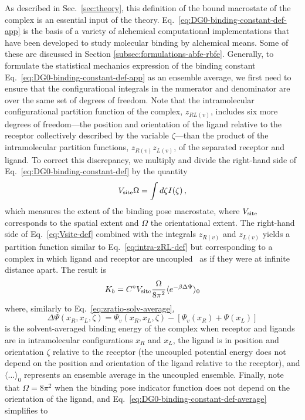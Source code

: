 \documentclass[9pt,bestpractices]{livecoms}
\begin{document}
As described in Sec.~\ref{sec:theory}, this definition of the bound macrostate of the complex is an essential input of the theory.  Eq.~\ref{eq:DG0-binding-constant-def-app} is the basis of a variety of alchemical computational implementations that have been developed to study molecular binding by alchemical means. Some of these are discussed in Section \ref{subsec:formulations-abfe-rbfe}. Generally, to formulate the statistical mechanics expression of the binding constant Eq.~\ref{eq:DG0-binding-constant-def-app} as an ensemble average, we first need to ensure that the configurational integrals in the numerator and denominator are over the same set of degrees of freedom. Note that the intramolecular configurational partition function of the complex, $z_{RL(v)}$, includes six more degrees of freedom---the position and orientation of the ligand relative to the receptor collectively described by the variable $\zeta$---than the product of the intramolecular partition functions, $z_{R(v)} z_{L(v)}$, of the separated receptor and ligand. To correct this discrepancy, we multiply and divide the right-hand side of Eq.~\ref{eq:DG0-binding-constant-def}  by the quantity
\begin{equation} \label{eq:Vsite-def}
    V_{\rm site} \Omega = \int d\zeta I(\zeta) \, ,
\end{equation}
which measures the extent of the binding pose macrostate, where $V_{\rm site}$ corresponds to the spatial extent and $\Omega$ the orientational extent. The right-hand side of Eq.~\ref{eq:Vsite-def} combined with the integrals $z_{R(v)}$ and $z_{L(v)}$ yields a partition function similar to Eq.~\ref{eq:intra-zRL-def} but corresponding to a complex in which ligand and receptor are uncoupled~\cite{gallicchio2011recent} as if they were at infinite distance apart. The result is
\begin{equation}\label{eq:DG0-binding-constant-def-average}
  K_b = C^\circ V_{\rm site} \frac{\Omega}{8 \pi^2} \langle e^{-\beta \Delta \Psi}  \rangle_0
\end{equation}
where, similarly to Eq.~\ref{eq:zratio-solv-average},
\begin{equation}\label{eq:pert-energy-def}
  \Delta \Psi(x_R, x_L, \zeta) =  \Psi_v(x_R, x_L, \zeta) - \left[  \Psi_v(x_R) + \Psi(x_L) \right]
\end{equation}
is the solvent-averaged binding energy of the complex when receptor and ligands are in intramolecular configurations $x_R$ and $x_L$, the ligand is in position and orientation $\zeta$ relative to the receptor (the uncoupled potential energy does not depend on  the position and orientation of the ligand relative to the receptor), and $\langle \ldots \rangle_0$ represents an ensemble average in the uncoupled ensemble. Finally, note that $\Omega = 8 \pi^2$ when the binding pose indicator function does not depend on the orientation of the ligand, and Eq.~\ref{eq:DG0-binding-constant-def-average} simplifies to
\end{document}
